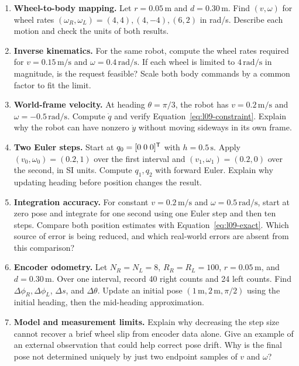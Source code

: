 \begin{enumerate}
\item \textbf{Wheel-to-body mapping.} Let $r=0.05\,\mathrm m$ and
$d=0.30\,\mathrm m$. Find $(v,\omega)$ for wheel rates
$(\omega_R,\omega_L)=(4,4),(4,-4),(6,2)$ in rad/s. Describe each motion
and check the units of both results.

\item \textbf{Inverse kinematics.} For the same robot, compute the wheel
rates required for $v=0.15\,\mathrm{m/s}$ and $\omega=0.4\,\mathrm{rad/s}$.
If each wheel is limited to $4\,\mathrm{rad/s}$ in magnitude, is the request
feasible? Scale both body commands by a common factor to fit the limit.

\item \textbf{World-frame velocity.} At heading $\theta=\pi/3$, the robot
has $v=0.2\,\mathrm{m/s}$ and $\omega=-0.5\,\mathrm{rad/s}$.
Compute $\dot q$ and verify Equation~\eqref{eq:l09-constraint}. Explain why
the robot can have nonzero $\dot y$ without moving sideways in its own frame.

\item \textbf{Two Euler steps.} Start at $q_0=[0\;0\;0]^{\mathsf T}$ with
$h=0.5\,\mathrm s$. Apply $(v_0,\omega_0)=(0.2,1)$ over the first interval
and $(v_1,\omega_1)=(0.2,0)$ over the second, in SI units. Compute $q_1,q_2$
with forward Euler. Explain why updating heading before position changes
the result.

\item \textbf{Integration accuracy.} For constant $v=0.2\,\mathrm{m/s}$
and $\omega=0.5\,\mathrm{rad/s}$, start at zero pose and integrate for one
second using one Euler step and then ten steps. Compare both position
estimates with Equation~\eqref{eq:l09-exact}. Which source of error is
being reduced, and which real-world errors are absent from this comparison?

\item \textbf{Encoder odometry.} Let $N_R=N_L=8$, $R_R=R_L=100$,
$r=0.05\,\mathrm m$, and $d=0.30\,\mathrm m$. Over one interval, record
40 right counts and 24 left counts. Find $\Delta\phi_R,\Delta\phi_L$,
$\Delta s$, and $\Delta\theta$. Update an initial pose
$(1\,\mathrm m,2\,\mathrm m,\pi/2)$ using the initial heading, then the
mid-heading approximation.

\item \textbf{Model and measurement limits.} Explain why decreasing the
step size cannot recover a brief wheel slip from encoder data alone. Give
an example of an external observation that could help correct pose drift.
Why is the final pose not determined uniquely by just two endpoint samples
of $v$ and $\omega$?
\end{enumerate}
